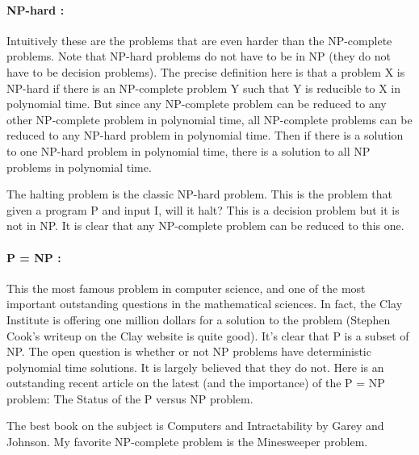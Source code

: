 \documentclass[12pt]{article}
\begin{document}
\paragraph{NP-hard :} Intuitively these are the problems that are even harder than the NP-complete problems. Note that NP-hard problems do not have to be in NP (they do not have to be decision problems). The precise definition here is that a problem X is NP-hard if there is an NP-complete problem Y such that Y is reducible to X in polynomial time. But since any NP-complete problem can be reduced to any other NP-complete problem in polynomial time, all NP-complete problems can be reduced to any NP-hard problem in polynomial time. Then if there is a solution to one NP-hard problem in polynomial time, there is a solution to all NP problems in polynomial time.

The halting problem is the classic NP-hard problem. This is the problem that given a program P and input I, will it halt? This is a decision problem but it is not in NP. It is clear that any NP-complete problem can be reduced to this one.

\paragraph{P = NP :} This the most famous problem in computer science, and one of the most important outstanding questions in the mathematical sciences. In fact, the Clay Institute is offering one million dollars for a solution to the problem (Stephen Cook's writeup on the Clay website is quite good). It's clear that P is a subset of NP. The open question is whether or not NP problems have deterministic polynomial time solutions. It is largely believed that they do not. Here is an outstanding recent article on the latest (and the importance) of the P = NP problem: The Status of the P versus NP problem.

The best book on the subject is Computers and Intractability by Garey and Johnson. My favorite NP-complete problem is the Minesweeper problem.


\end{document}
